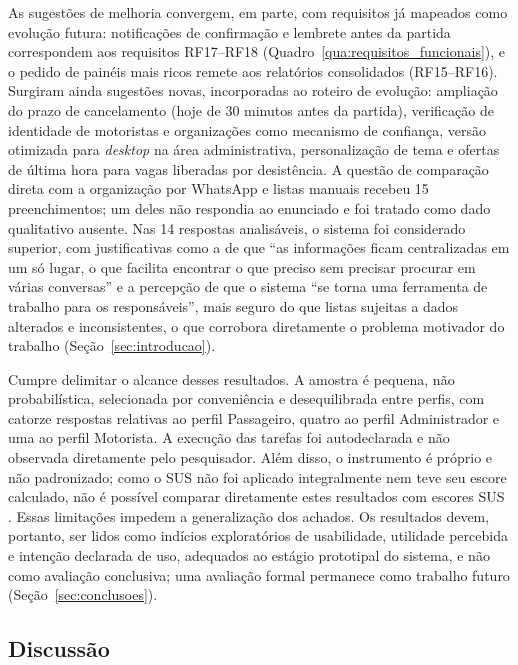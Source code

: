 \documentclass[a4paper,12pt]{article}
\begin{document}
As sugestões de melhoria convergem, em parte, com requisitos já mapeados como evolução futura: notificações de confirmação e lembrete antes da partida correspondem aos requisitos RF17--RF18 (Quadro~\ref{qua:requisitos_funcionais}), e o pedido de painéis mais ricos remete aos relatórios consolidados (RF15--RF16). Surgiram ainda sugestões novas, incorporadas ao roteiro de evolução: ampliação do prazo de cancelamento (hoje de 30 minutos antes da partida), verificação de identidade de motoristas e organizações como mecanismo de confiança, versão otimizada para \textit{desktop} na área administrativa, personalização de tema e ofertas de última hora para vagas liberadas por desistência. A questão de comparação direta com a organização por WhatsApp e listas manuais recebeu 15 preenchimentos; um deles não respondia ao enunciado e foi tratado como dado qualitativo ausente. Nas 14 respostas analisáveis, o sistema foi considerado superior, com justificativas como a de que ``as informações ficam centralizadas em um só lugar, o que facilita encontrar o que preciso sem precisar procurar em várias conversas'' e a percepção de que o sistema ``se torna uma ferramenta de trabalho para os responsáveis'', mais seguro do que listas sujeitas a dados alterados e inconsistentes, o que corrobora diretamente o problema motivador do trabalho (Seção~\ref{sec:introducao}).

Cumpre delimitar o alcance desses resultados. A amostra é pequena, não probabilística, selecionada por conveniência e desequilibrada entre perfis, com catorze respostas relativas ao perfil Passageiro, quatro ao perfil Administrador e uma ao perfil Motorista. A execução das tarefas foi autodeclarada e não observada diretamente pelo pesquisador. Além disso, o instrumento é próprio e não padronizado; como o SUS não foi aplicado integralmente nem teve seu escore calculado, não é possível comparar diretamente estes resultados com escores SUS \cite{brooke1996}. Essas limitações impedem a generalização dos achados. Os resultados devem, portanto, ser lidos como indícios exploratórios de usabilidade, utilidade percebida e intenção declarada de uso, adequados ao estágio prototipal do sistema, e não como avaliação conclusiva; uma avaliação formal permanece como trabalho futuro (Seção~\ref{sec:conclusoes}).

\subsection{Discussão}
\label{sec:discussao}
\end{document}
